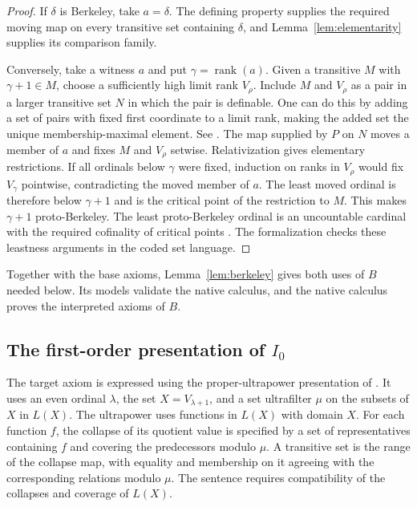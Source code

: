 \documentclass[11pt,letterpaper]{article}
\theoremstyle{definition}
\begin{document}
\begin{proof}
If $\delta$ is Berkeley, take $a=\delta$. The defining property
supplies the required moving map on every transitive set containing
$\delta$, and Lemma~\ref{lem:elementarity} supplies its comparison
family.

Conversely, take a witness $a$ and put $\gamma=\operatorname{rank}(a)$.
Given a transitive $M$ with $\gamma+1\in M$, choose a sufficiently
high limit rank $V_\rho$. Include $M$ and $V_\rho$ as a pair in a
larger transitive set $N$ in which the pair is definable. One can
do this by adding a set of pairs with fixed first coordinate to a
limit rank, making the added set the unique membership-maximal
element. See \cite[Lemma~3.1]{bkw}. The map supplied by $P$ on $N$
moves a member of $a$ and fixes $M$ and $V_\rho$ setwise.
Relativization gives elementary restrictions. If all ordinals
below $\gamma$ were fixed, induction on ranks in $V_\rho$ would
fix $V_\gamma$ pointwise, contradicting the moved member of $a$.
The least moved ordinal is therefore below $\gamma+1$ and is
the critical point of the restriction to $M$. This makes
$\gamma+1$ proto-Berkeley. The least proto-Berkeley ordinal is
an uncountable cardinal with the required cofinality of critical
points \cite[Theorem~3.3 and Remark~3.5]{bkw}. The formalization
checks these leastness arguments in the coded set language.
\end{proof}

Together with the base axioms, Lemma~\ref{lem:berkeley} gives
both uses of $B$ needed below. Its models validate the native
calculus, and the native calculus proves the interpreted axioms
of $B$.

\subsection{The first-order presentation of \texorpdfstring{$I_0$}{I0}}

The target axiom is expressed using the proper-ultrapower
presentation of \cite[Definitions~2.5 and~2.7 and Proposition~3.5]{schlutzenberg}.
It uses an even ordinal $\lambda$, the set $X=V_{\lambda+1}$,
and a set ultrafilter $\mu$ on the subsets of $X$ in $L(X)$.
The ultrapower uses functions in $L(X)$ with domain $X$.
For each function $f$, the collapse of its quotient value is
specified by a set of representatives containing $f$ and covering
the predecessors modulo $\mu$. A transitive set is the range of
the collapse map, with equality and membership on it agreeing
with the corresponding relations modulo $\mu$.
The sentence requires compatibility of the collapses and coverage
of $L(X)$.
\end{document}
